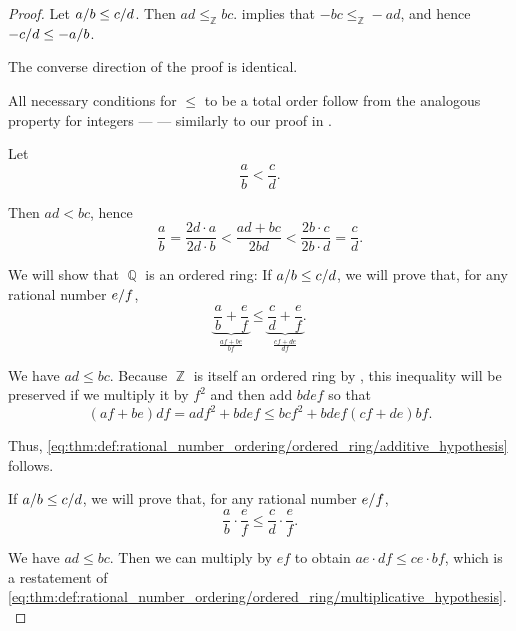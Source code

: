\begin{proof}
   Let \( \ifrac a b \leq \ifrac c d \). Then \( ad \leq_\BbbZ bc \).  implies that \( -bc \leq_\BbbZ -ad \), and hence \( - \ifrac c d \leq - \ifrac a b \).

  The converse direction of the proof is identical.

   All necessary conditions for \( \leq \) to be a total order follow from the analogous property for integers ---  --- similarly to our proof in .

   Let
  \begin{equation*}
    \frac a b < \frac c d.
  \end{equation*}

  Then \( ad < bc \), hence
  \begin{equation*}
    \frac a b = \frac {2d \cdot a} {2d \cdot b} < \frac {ad + bc} {2bd} < \frac {2b \cdot c} {2b \cdot d} = \frac c d.
  \end{equation*}

   We will show that \( \BbbQ \) is an ordered ring:
   If \( \ifrac a b \leq \ifrac c d \), we will prove that, for any rational number \( \ifrac e f \),
  \begin{equation}\label{eq:thm:def:rational_number_ordering/ordered_ring/additive_hypothesis}
    \underbrace{\frac a b + \frac e f}_{\frac {af + be} {bf}} \leq \underbrace{\frac c d  + \frac e f}_{\frac {cf + de} {df}}.
  \end{equation}

  We have \( ad \leq bc \). Because \( \BbbZ \) is itself an ordered ring by , this inequality will be preserved if we multiply it by \( f^2 \) and then add \( bdef \) so that
  \begin{equation*}
    (af + be) df = adf^2 + bdef \leq bcf^2 + bdef (cf + de) bf.
  \end{equation*}

  Thus, \eqref{eq:thm:def:rational_number_ordering/ordered_ring/additive_hypothesis} follows.

   If \( \ifrac a b \leq \ifrac c d \), we will prove that, for any rational number \( \ifrac e f \),
  \begin{equation}\label{eq:thm:def:rational_number_ordering/ordered_ring/multiplicative_hypothesis}
    \frac a b \cdot \frac e f \leq \frac c d \cdot \frac e f.
  \end{equation}

  We have \( ad \leq bc \). Then we can multiply by \( ef \) to obtain \( ae \cdot df \leq ce \cdot bf \), which is a restatement of \eqref{eq:thm:def:rational_number_ordering/ordered_ring/multiplicative_hypothesis}.
\end{proof}

